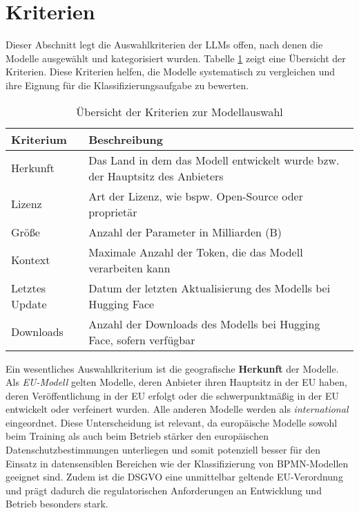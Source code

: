 \section{Kriterien}\label{sec:kriterien}

Dieser Abschnitt legt die Auswahlkriterien der \acp{LLM} offen, nach denen die Modelle ausgewählt und kategorisiert wurden. Tabelle \ref{tab:kriterien} zeigt eine Übersicht der Kriterien. Diese Kriterien helfen, die Modelle systematisch zu vergleichen und ihre Eignung für die Klassifizierungsaufgabe zu bewerten.

\begin{table}[htbp]
    \centering
    \caption{Übersicht der Kriterien zur Modellauswahl}
    \label{tab:kriterien}
    \begin{tabularx}{\textwidth}{p{} p{}}
        \toprule
        \textbf{Kriterium} & \textbf{Beschreibung} \\
        \midrule
        Herkunft & Das Land in dem das Modell entwickelt wurde bzw. der Hauptsitz des Anbieters \\
        Lizenz & Art der Lizenz, wie bspw. Open-Source oder proprietär \\
        Größe & Anzahl der Parameter in Milliarden (B) \\
        Kontext & Maximale Anzahl der Token, die das Modell verarbeiten kann \\
        Letztes Update & Datum der letzten Aktualisierung des Modells bei Hugging Face \cite{huggingface} \\
        Downloads & Anzahl der Downloads des Modells bei Hugging Face, sofern verfügbar \\
        \bottomrule
    \end{tabularx}
\end{table}

Ein wesentliches Auswahlkriterium ist die geografische \textbf{Herkunft} der Modelle. Als \emph{\ac{EU}-Modell} gelten Modelle, deren Anbieter ihren Hauptsitz in der \ac{EU} haben, deren Veröffentlichung in der \ac{EU} erfolgt oder die schwerpunktmäßig in der \ac{EU} entwickelt oder verfeinert wurden. Alle anderen Modelle werden als \emph{international} eingeordnet. Diese Unterscheidung ist relevant, da europäische Modelle sowohl beim Training als auch beim Betrieb stärker den europäischen Datenschutzbestimmungen unterliegen und somit potenziell besser für den Einsatz in datensensiblen Bereichen wie der Klassifizierung von \ac{BPMN}-Modellen geeignet sind. Zudem ist die \ac{DSGVO} eine unmittelbar geltende \ac{EU}-Verordnung und prägt dadurch die regulatorischen Anforderungen an Entwicklung und Betrieb besonders stark.

